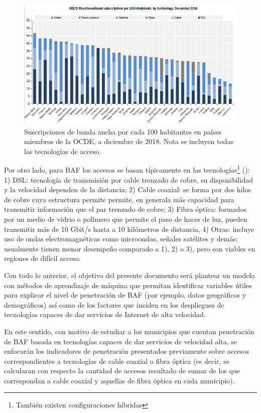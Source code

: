 \documentclass[9pt,twocolumn,twoside]{ilcss}
\begin{document}
\begin{figure}[tbhp]
	\centering
	\includegraphics[width=1\linewidth]{images/ocde.png}
	\caption{Suscripciones de banda ancha por cada 100 habitantes en países miembros de la OCDE, a diciembre de 2018. Nota se incluyen todas las tecnologías de acceso.}
	\label{fig:ocde}
\end{figure}

Por otro lado, para BAF los accesos se basan típicamente en las tecnologías\footnote{También existen configuraciones híbridas} (\cite{moya2014telecomunicaciones}): 1) DSL: tecnología de transmisión por cable trenzado de cobre, su disponibilidad y la velocidad dependen de la distancia; 2) Cable coaxial: se forma por dos hilos de cobre cuya estructura permite permite, en generala más capacidad para transmitir información que el par trenzado de cobre; 3) Fibra óptica: formados por un medio de vidrio o polímero que permite el paso de haces de luz, pueden transmitir más de 10 Gbit/s hasta a 10 kilómetros de distancia, 4) Otras: incluye uso de ondas electromagnéticas como microondas, señales satélites y demás; usualmente  tienen menor desempeño comparado a 1), 2) o 3), pero son viables en regiones de difícil acceso.

Con todo lo anterior, el objetivo del presente documento será plantear un modelo con métodos de aprendizaje de máquina que permitan identificar variables útiles para explicar el nivel de penetración de BAF (por ejemplo, datos geográficos y demográficos) así como de los factores que inciden en los despliegues de tecnologías capaces de dar servicios de Internet de alta velocidad. 

En este sentido, con motivo de estudiar a los municipios que cuentan penetración de BAF basada en tecnologías capaces de dar servicios de velocidad alta, se enfocarán los indicadores de penetración presentados previamente sobre accesos correspondientes a tecnologías de cable coaxial o fibra óptica (es decir, se calcularan con respecto la cantidad de accesos resultado de sumar de los que correspondan a cable coaxial y aquellas de fibra óptica en cada municipio).
\end{document}
